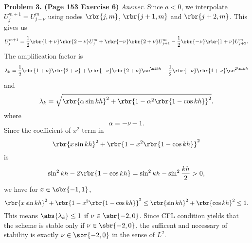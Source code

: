 \documentclass[english, nochinese]{pnote}
\begin{document}
\textbf{Problem 3. (Page 153 Exercise 6)} \textit{Answer.} Since $ a < 0 $, we interpolate $ U_j^{ m + 1 } = U_{ j - \nu }^m $ using nodes $ \rbr{ j, m } $, $ \rbr{ j + 1, m } $ and $ \rbr{ j + 2, m } $. This gives us
\begin{equation}
U_j^{ m + 1 } = \frac{1}{2} \rbr{ 1 + \nu } \rbr{ 2 + \nu } U_j^m + \rbr{-\nu} \rbr{ 2 + \nu } U_{ j + 1 }^m - \frac{1}{2} \rbr{-\nu} \rbr{ 1 + \nu } U_{ j + 2 }^m.
\end{equation}
The amplification factor is
\begin{equation}
\lambda_k = \frac{1}{2} \rbr{ 1 + \nu } \rbr{ 2 + \nu }+ \rbr{-\nu} \rbr{ 2 + \nu } \se^{ \si k h } - \frac{1}{2} \rbr{-\nu} \rbr{ 1 + \nu } \se^{ 2 \si k h }
\end{equation}
and
\begin{equation}
\lambda_k = \sqrt{ \rbr{ \alpha \sin k h }^2 + \rbr{ 1 - \alpha^2 \rbr{ 1 - \cos k h } }^2 }.
\end{equation}
where
\begin{equation}
\alpha = -\nu - 1.
\end{equation}
Since the coefficient of $x^2$ term in
\begin{equation}
\rbr{ x \sin k h }^2 + \rbr{ 1 - x^2 \rbr{ 1 - \cos k h } }^2
\end{equation}
is
\begin{equation}
\sin^2 k h  - 2 \rbr{ 1 - \cos k h } = \sin^2 k h - \sin^2 \frac{ k h }{2} > 0,
\end{equation}
we have for $ x \in \sbr{ -1, 1 } $,
\begin{equation}
\rbr{ x \sin k h }^2 + \rbr{ 1 - x^2 \rbr{ 1 - \cos k h } }^2 \le \rbr{ \sin k h }^2 + \rbr{ \cos k h }^2 \le 1.
\end{equation}
This means $ \abs{\lambda_k} \le 1 $ if $ \nu \in \sbr{ -2, 0 } $. Since CFL condition yields that the scheme is stable only if $ \nu \in \sbr{ -2, 0 } $, the sufficent and necessary of stability is exactly $ \nu \in \sbr{ -2, 0 } $ in the sense of $L^2$.
\end{document}

